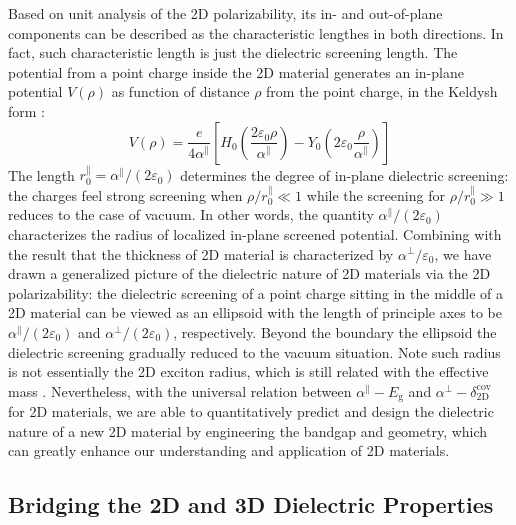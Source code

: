 \documentclass[journal=ancac3,manuscript=article,email=true,hyperref=true,keywords=false]{achemso}
\begin{document}
Based on unit analysis of the 2D polarizability, its in- and
out-of-plane components can be described as the characteristic
lengthes in both directions. In fact, such characteristic length is
just the dielectric screening length. The potential from a point
charge inside the 2D material generates an in-plane potential
$V(\rho)$ as function of distance $\rho$ from the point charge, in the
Keldysh form \cite{Keldysh_1979_eps_multi,Pulci_2014}:
\begin{equation}
  \label{eq:Keldysh}
  V(\rho) = \frac{e}{4 \alpha^{\parallel}}
  \left[H_{0}(\frac{2\varepsilon_{0}\rho}{\alpha^{\parallel}})
    - Y_{0}(2 \varepsilon_{0}\frac{\rho}{\alpha^{\parallel}})\right]
\end{equation}
The length $r^{\parallel}_{0} = \alpha^{\parallel}/(2\varepsilon_{0})$
determines the degree of in-plane dielectric screening: the charges
feel strong screening when $\rho/r^{\parallel}_{0} \ll 1$ while the
screening for $\rho/r^{\parallel}_{0} \gg 1$ reduces to the case of
vacuum. In other words, the quantity
$\alpha^{\parallel}/(2\varepsilon_{0})$ characterizes the radius of
localized in-plane screened potential. Combining with the result that
the thickness of 2D material is characterized by
$\alpha^{\perp}/\varepsilon_{0}$, we have drawn a generalized picture
of the dielectric nature of 2D materials via the 2D polarizability:
the dielectric screening of a point charge sitting in the middle of a
2D material can be viewed as an ellipsoid with the length of
principle axes to be $\alpha^{\parallel}/(2 \varepsilon_{0})$ and
$\alpha^{\perp}/(2 \varepsilon_{0})$, respectively. Beyond the
boundary the ellipsoid the dielectric screening gradually reduced to
the vacuum situation. Note such radius is not essentially the 2D
exciton radius, which is still related with the effective mass
\cite{Chernikov_2014_EB_MoS2_2D3D}. Nevertheless, with the universal
relation between $\alpha^{\parallel}-E_{\mathrm{g}}$ and
$\alpha^{\perp}-\delta_{\mathrm{2D}}^{\mathrm{cov}}$ for 2D materials,
we are able to quantitatively predict and design the dielectric nature
of a new 2D material by engineering the bandgap and geometry, which
can greatly enhance our understanding and application of 2D materials.



\subsection{Bridging the 2D and 3D Dielectric Properties}
\label{sec:2D-3D}
\end{document}
